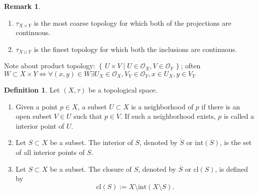 \documentclass[a4paper]{book}
\theoremstyle{definition}
\newtheorem{definition}{Definition}[chapter]
\newtheorem*{remark}{Remark}
\newcommand{\makeset}[2]{\left\{\, #1 \mid #2 \,\right\}}
\begin{document}
\begin{remark}
    \begin{enumerate}
        \item \(\tau_{X \times Y}\) is the most coarse topology for which both of the projections are continuous.
        \item \(\tau_{X \sqcup Y}\) is the finest topology for which both the inclusions are continuous.
    \end{enumerate}
\end{remark}

    Note about product topology: \(\makeset{U \times V}{U \in \mathcal{O}_X, V \in \mathcal{O}_Y}\); often \(W \subset X \times Y \iff \forall (x, y) \in W \exists U_X \in \mathcal{O}_X, V_Y \in \mathcal{O}_Y, x \in U_X, y \in V_Y\)

\begin{defbox}
    \begin{definition}
        Let \((X, \tau)\) be a topological space.
        \begin{enumerate}
            \item Given a {\color{mathobj}point} \(p \in X\), a subset \(U \subset X\) is a neighborhood of \(p\) if there is an open subset \(V \in U\) such that \(p \in V\). If such a neighborhood exists, \(p\) is called a interior point of \(U\).
            \item Let \(S \subset X\) be a subset. The interior of \(S\), denoted by \(\mathring{S}\) or \(\mathrm{int}(S)\), is the {\color{mathobj}set} of all interior points of \(S\).
            \item Let \(S \subset X\) be a subset. The closure of \(S\), denoted by \(\overline{S}\) or \(\mathrm{cl}(S)\), is defined by
            \begin{equation*}
                \mathrm{cl}(S) := X \setminus \mathrm{int}(X \setminus S) \text{.}
            \end{equation*}
        \end{enumerate}
    \end{definition}
\end{defbox}
\end{document}
